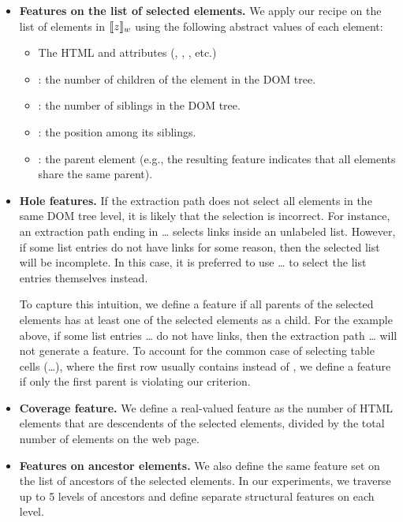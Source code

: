 \begin{itemize}
\item \textbf{Features on the list of selected elements.}
We apply our recipe on the list of elements in $\llbracket{z}\rrbracket_{w}$ using
the following abstract values of each element:
\begin{itemize}
\item The HTML  and attributes (, , , etc.)
\item {}: the number of children of the element in the DOM tree.
\item {}: the number of siblings in the DOM tree.
\item {}: the position among its siblings.
\item {}: the parent element
(e.g., the resulting  feature indicates
that all elements share the same parent).
\end{itemize}

\item \textbf{Hole features.}
If the extraction path does not select all elements
in the same DOM tree level,
it is likely that the selection is incorrect.
For instance, an extraction path ending in \dots{}
selects links inside an unlabeled list.
However, if some list entries do not have links for some reason,
then the selected list will be incomplete.
In this case, it is preferred to use \dots{}
to select the list entries themselves instead.

To capture this intuition,
we define a  feature
if all parents of the selected elements
has at least one of the selected elements as a child.
For the example above,
if some list entries \dots{} do not have links,
then the extraction path \dots{}
will not generate a  feature.
To account for the common case of selecting table cells (\dots{}),
where the first row  usually contains  instead of ,
we define a  feature
if only the first parent is violating our criterion.

\item \textbf{Coverage feature.}
We define a real-valued feature 
as the number of HTML elements that are descendents 
of the selected elements, divided by the total number of elements
on the web page.

\item \textbf{Features on ancestor elements.}
We also define the same feature set on the list of ancestors
of the selected elements.
In our experiments, we traverse up to 5 levels of ancestors
and define separate structural features on each level.

\end{itemize}

